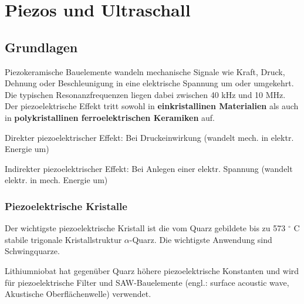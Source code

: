 \section{Piezos und Ultraschall}

\subsection{Grundlagen}
Piezokeramische Bauelemente wandeln mechanische Signale wie Kraft, Druck, Dehnung oder
Beschleunigung in eine elektrische Spannung um oder umgekehrt. Die typischen Resonanzfrequenzen liegen dabei zwischen 40 kHz und 10 MHz. Der piezoelektrische Effekt tritt sowohl in \textbf{einkristallinen Materialien} als auch
in \textbf{polykristallinen ferroelektrischen Keramiken} auf.
\begin{compactitem}
    \item Direkter piezoelektrischer Effekt: Bei Druckeinwirkung (wandelt mech. in elektr. Energie um)
    \item Indirekter piezoelektrischer Effekt: Bei Anlegen einer elektr. Spannung (wandelt elektr. in mech. Energie um)
\end{compactitem}

\subsubsection{Piezoelektrische Kristalle}
\begin{compactitem}
    \item Der wichtigste piezoelektrische Kristall ist die vom Quarz gebildete bis zu 573 ${^\circ}$ C stabile trigonale Kristallstruktur $\alpha$-Quarz. Die wichtigste Anwendung sind Schwingquarze.
    \item Lithiumniobat hat gegenüber Quarz höhere piezoelektrische Konstanten und wird für piezoelektrische Filter und SAW-Bauelemente (engl.: surface acoustic wave, Akustische Oberflächenwelle) verwendet.
\end{compactitem}

